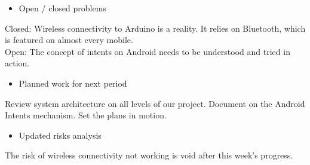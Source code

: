 \newpage
\begin{itemize}
\item Open / closed problems
\end{itemize}
Closed: Wireless connectivity to Arduino is a reality. It relies on Bluetooth,
which is featured on almost every mobile.
\\
Open: The concept of intents on Android needs to be understood and tried in action.

\begin{itemize}
\item Planned work for next period
\end{itemize}
Review system architecture on all levels of our project.
Document on the Android Intents mechanism.
Set the plans in motion.

\begin{itemize}
\item Updated risks analysis
\end{itemize}
The risk of wireless connectivity not working is void after this week's progress.
